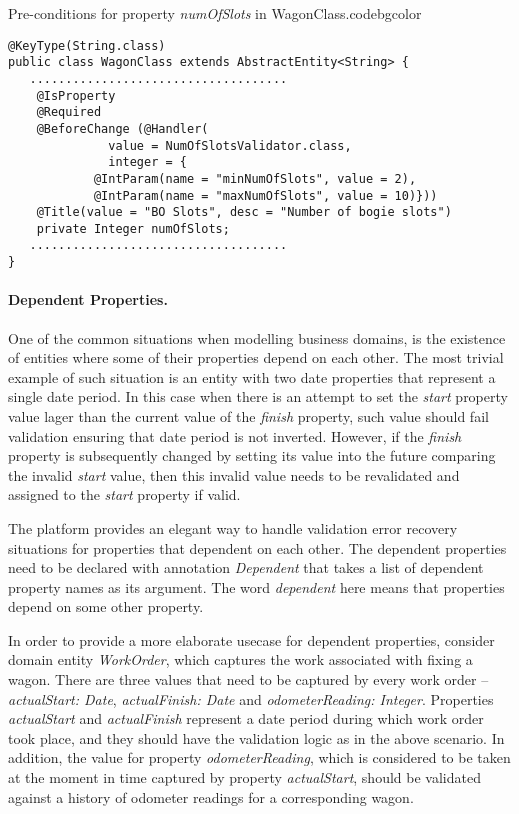   \begin{code}{Pre-conditions for property \emph{numOfSlots} in WagonClass.}{\label{lst:PreConditionWagonClassNumOfSlotsProperty}}{codebgcolor}
    \begin{lstlisting}
@KeyType(String.class)
public class WagonClass extends AbstractEntity<String> {  
   ....................................
    @IsProperty
    @Required
    @BeforeChange (@Handler(
		      value = NumOfSlotsValidator.class, 
		      integer = {
			@IntParam(name = "minNumOfSlots", value = 2), 
			@IntParam(name = "maxNumOfSlots", value = 10)}))
    @Title(value = "BO Slots", desc = "Number of bogie slots")
    private Integer numOfSlots;
   ....................................
}
    \end{lstlisting}
  \end{code}



  \paragraph*{Dependent Properties.}

  One of the common situations when modelling business domains, is the existence of entities where some of their properties depend on each other.
  The most trivial example of such situation is an entity with two date properties that represent a single date period.
  In this case when there is an attempt to set the \emph{start} property value lager than the current value of the \emph{finish} property, such value should fail validation ensuring that date period is not inverted.
  However, if the \emph{finish} property is subsequently changed by setting its value into the future comparing the invalid \emph{start} value, then this invalid value needs to be revalidated and assigned to the \emph{start} property if valid.
  
  The platform provides an elegant way to handle validation error recovery situations for properties that dependent on each other. 
  The dependent properties need to be declared with annotation \emph{Dependent} that takes a list of dependent property names as its argument. 
  The word \emph{dependent} here means that properties depend on some other property. 
  
  In order to provide a more elaborate usecase for dependent properties, consider domain entity \emph{WorkOrder}, which captures the work associated with fixing a wagon.
  There are three values that need to be captured by every work order -- \emph{actualStart: Date}, \emph{actualFinish: Date} and \emph{odometerReading: Integer}.
  Properties \emph{actualStart} and \emph{actualFinish} represent a date period during which work order took place, and they should have the validation logic as in the above scenario.
  In addition, the value for property \emph{odometerReading}, which is considered to be taken at the moment in time captured by property \emph{actualStart}, should be validated against a history of odometer readings for a corresponding wagon.

